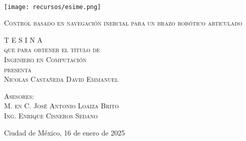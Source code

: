 \begin{minipage}[c][0.81\textheight][t]{0.22\textwidth}
	\begin{center}
		\color{Black}\vrule width1pt height16cm 
		\vspace{5mm}
		\hskip2pt
		\color{Black}\vrule width1pt height16cm
		\hskip2mm
		\color{Black}\vrule width1pt height16cm \\
		\texttt{[image: recursos/esime.png]}
	\end{center}
\end{minipage}
\begin{minipage}[c][0.70\textheight][t]{0.7\textwidth}
	\begin{center}
		\vspace{1.5cm}
		
		{\Huge\scshape Control basado en navegaci\'on inercial para un brazo rob\'otico articulado}
		
		\vspace{3.5cm}            
		
		\textsc{\LARGE T   E   S   I   N   A}\\[0.5cm]
		\textsc{\large que para obtener el t\'itulo de}\\[0.5cm]
		\textsc{\large Ingeniero en Computaci\'on}\\[0.5cm]
		\textsc{\large presenta}\\[0.5cm]
		\textsc{\large Nicolas Castañeda David Emmanuel}\\[2cm]          
		
		\vspace{1cm}
		
	\end{center}
	
	{\large\scshape Asesores:\\[0.3cm] {M. en C. Jos\'e Antonio Loaiza Brito\\ 
			Ing. Enrique Cisneros Sedano}}
	
	\vspace{0.5cm}
	
	\begin{flushright}
		\large{Ciudad de México, 16 de enero de 2025}
	\end{flushright}
\end{minipage}

\restoregeometry

\onehalfspacing